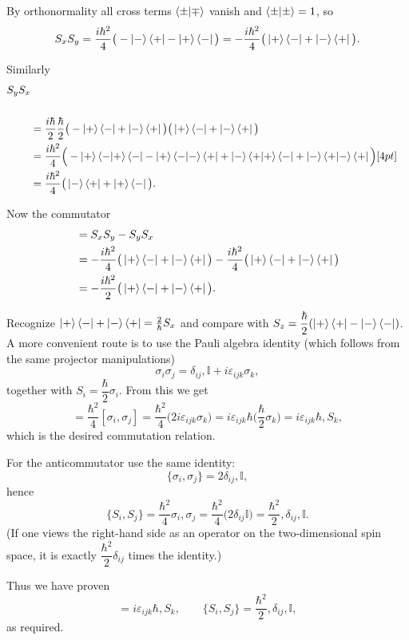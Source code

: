 \documentclass[10pt,twocoloumn]{article}
\begin{document}
By orthonormality all cross terms $\left\langle \pm \middle| \mp \right\rangle$ vanish and $\left\langle \pm \middle| \pm \right\rangle=1$, so
\begin{equation}
S_xS_y=\frac{i\hbar^2}{4}\big( -\left| - \right\rangle\left\langle + \right|-\left| + \right\rangle\left\langle - \right|\big)
=-\frac{i\hbar^2}{4}\big(\left| + \right\rangle\left\langle - \right|+\left| - \right\rangle\left\langle + \right|\big).
\end{equation}

Similarly
\begin{align}
S_yS_x\\
\\ &=\frac{i\hbar}{2}\frac{\hbar}{2}\big(-\left| + \right\rangle\left\langle - \right|+\left| - \right\rangle\left\langle + \right|\big)\big(\left| + \right\rangle\left\langle - \right|+\left| - \right\rangle\left\langle + \right|\big)
\\ &=\frac{i\hbar^2}{4}\Big(
-\left| + \right\rangle\left\langle - \middle| + \right\rangle\left\langle - \right|-\left| + \right\rangle\left\langle - \middle| - \right\rangle\left\langle + \right|
+\left| - \right\rangle\left\langle + \middle| + \right\rangle\left\langle - \right|+\left| - \right\rangle\left\langle + \middle| - \right\rangle\left\langle + \right|
\Big)[4pt]
\\ &=\frac{i\hbar^2}{4}\big(\left| - \right\rangle\left\langle + \right|+\left| + \right\rangle\left\langle - \right|\big).
\end{align}

Now the commutator
\begin{align}
[S_x,S_y]&=S_xS_y-S_yS_x\\
&=-\frac{i\hbar^2}{4}\big(\ket{+}\bra{-}+\ket{-}\bra{+}\big)
-\frac{i\hbar^2}{4}\big(\ket{+}\bra{-}+\ket{-}\bra{+}\big)
\\ &=-\frac{i\hbar^2}{2}\big(\ket{+}\bra{-}+\ket{-}\bra{+}\big).
\end{align}

Recognize $\left| + \right\rangle\left\langle - \right|+\left| - \right\rangle\left\langle + \right|=\tfrac{2}{\hbar}S_x$ and compare with $S_z=\dfrac{\hbar}{2}(\left| + \right\rangle\left\langle + \right|-\left| - \right\rangle\left\langle - \right|)$. A more convenient route is to use the Pauli algebra identity (which follows from the same projector manipulations)
\begin{equation}
\sigma_i\sigma_j=\delta_{ij},\mathbb{I}+i\varepsilon_{ijk}\sigma_k,
\end{equation}
together with $S_i=\dfrac{\hbar}{2}\sigma_i$. From this we get
\begin{equation}
[S_i,S_j]=\frac{\hbar^2}{4}[\sigma_i,\sigma_j]
=\frac{\hbar^2}{4}\big(2i\varepsilon_{ijk}\sigma_k\big)
=i\varepsilon_{ijk}\hbar\Big(\frac{\hbar}{2}\sigma_k\Big)
= i\varepsilon_{ijk}\hbar,S_k,
\end{equation}
which is the desired commutation relation.

For the anticommutator use the same identity:
\begin{equation}
\{\sigma_i,\sigma_j\}=2\delta_{ij},\mathbb{I},
\end{equation}
hence
\begin{equation}
\{S_i,S_j\}=\frac{\hbar^2}{4}{\sigma_i,\sigma_j}
=\frac{\hbar^2}{4}\big(2\delta_{ij}\mathbb{I}\big)
=\frac{\hbar^2}{2},\delta_{ij},\mathbb{I}.
\end{equation}
(If one views the right-hand side as an operator on the two-dimensional spin space, it is exactly $\dfrac{\hbar^2}{2}\delta_{ij}$ times the identity.)

Thus we have proven
\begin{equation}
[S_i,S_j]=i\varepsilon_{ijk}\hbar,S_k,\qquad
\{S_i,S_j\}=\frac{\hbar^2}{2},\delta_{ij},\mathbb{I},
\end{equation}
as required.
\end{document}
